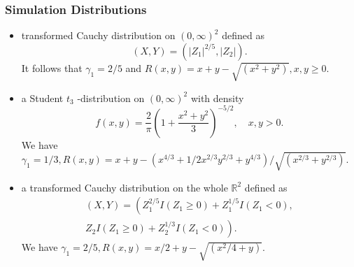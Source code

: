 \documentclass{beamer}
\begin{document}
\begin{frame}
    \frametitle{Simulation Distributions}

\begin{itemize}
    \item transformed Cauchy distribution on $(0,\infty)^2$ defined as
	$$
	(X,Y)=(|Z_1|^{2/5},|Z_2|).
	$$
	It follows that $\gamma_1=2/5$ and $R(x,y)=x+y-\sqrt{(x^2+y^2)}, x, y \ge 0.$

    \item a Student $t_3$ -distribution on $(0,\infty)^2$ with density
	$$
	f(x, y)=\frac{2}{\pi}\left(1+\frac{x^{2}+y^{2}}{3}\right)^{-5 / 2}, \quad x, y>0.
	$$
	We have $\gamma_1=1/3, R(x,y)=x+y-(x^{4/3}+1/2x^{2/3}y^{2/3}+y^{4/3})/\sqrt{(x^{2/3}+y^{2/3})}$.

\item  a transformed Cauchy distribution on the whole $\mathbb{R}^2$ defined as 
	$$
    \begin{aligned}
	(X, Y)=\left(Z_{1}^{2 / 5} I\left(Z_{1} \geqslant 0\right)+Z_{1}^{1 / 5} I\left(Z_{1}<0\right) \right., \\
    \left. Z_{2} I\left(Z_{1} \geqslant 0\right)+Z_{2}^{1 / 3} I\left(Z_{1}<0\right)\right).
    \end{aligned}
	$$
	We have $\gamma_1=2/5, R(x,y)=x/2+y-\sqrt{(x^2/4+y)}$.
    
\end{itemize}
\end{frame}
\end{document}
